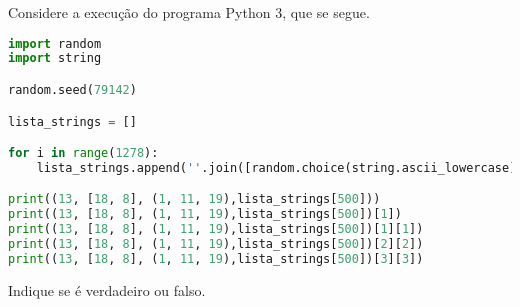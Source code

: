 \documentclass[12pt,varwidth=16cm,border=17pt]{standalone}
\begin{document}
Considere a execução do programa Python 3, que se segue. 

\begin{lstlisting}[language=Python]
import random
import string

random.seed(79142)

lista_strings = []

for i in range(1278):
	lista_strings.append(''.join([random.choice(string.ascii_lowercase) for i in range(6)]))

print((13, [18, 8], (1, 11, 19),lista_strings[500]))
print((13, [18, 8], (1, 11, 19),lista_strings[500])[1])
print((13, [18, 8], (1, 11, 19),lista_strings[500])[1][1])
print((13, [18, 8], (1, 11, 19),lista_strings[500])[2][2])
print((13, [18, 8], (1, 11, 19),lista_strings[500])[3][3])
\end{lstlisting}

Indique se é verdadeiro ou falso.
\end{document}
